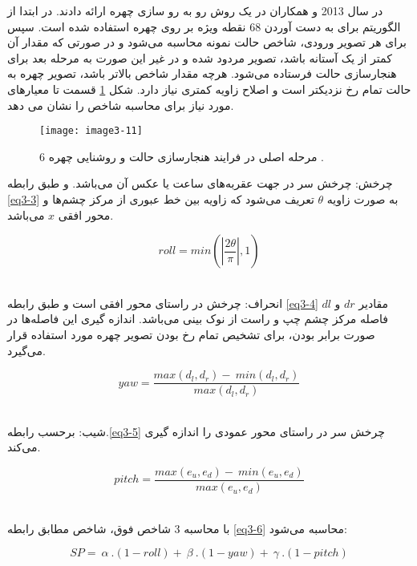 \noindent
در سال 2013  و همکاران در \cite{6196234} یک روش رو به رو سازی چهره ارائه دادند. در ابتدا از الگوریتم   برای به دست آوردن 68 نقطه ویژه بر روی چهره استفاده شده است. سپس برای هر تصویر ورودی، شاخص حالت نمونه   محاسبه می‌شود و در صورتی که مقدار آن کمتر از یک آستانه باشد، تصویر مردود شده و در غیر این صورت به مرحله بعد برای هنجارسازی حالت فرستاده می‌شود. هرچه مقدار شاخص  بالاتر باشد، تصویر چهره به حالت تمام رخ نزدیکتر است و اصلاح زاویه کمتری نیاز دارد. شکل \ref{image3-11} قسمت  تا  معیارهای مورد نیاز برای محاسبه شاخص  را نشان می دهد.

\begin{figure}[h]
\centering
  \texttt{[image: image3-11]}
  \caption{6 مرحله اصلی در فرایند هنجارسازی حالت و روشنایی چهره \cite{6196234}.}
  \label{image3-11}
\end{figure}

\noindent
چرخش: چرخش سر در جهت عقربه‌های ساعت یا عکس آن می‌باشد. و طبق رابطه \ref{eq3-3} به صورت زاویه $\theta$ تعریف می‌شود که زاویه بین خط عبوری از مرکز چشم‌ها و محور افقی $x$ می‌باشد.

\begin{equation}
\label{eq3-3}
roll=min(\left|\frac{2\theta}{\pi}\right|,1)
\end{equation}‏

\noindent	
انحراف: چرخش در راستای محور افقی است و طبق رابطه \ref{eq3-4} مقادیر $𝑑r$ و $𝑑l$ فاصله مرکز چشم چپ و راست از نوک بینی می‌باشد. اندازه گیری این فاصله‌ها در صورت برابر بودن، برای تشخیص تمام رخ بودن تصویر چهره مورد استفاده قرار می‌گیرد.

\begin{equation}
\label{eq3-4}
yaw=\frac{max\left(d_l,d_r\right)-\ min(d_l,d_r)}{max(d_l,d_r)}
\end{equation}‏

\noindent
شیب: برحسب رابطه.\ref{eq3-5} چرخش سر در راستای محور عمودی را اندازه گیری می‌کند.

\begin{equation}
\label{eq3-5}
pitch=\frac{max\left(e_u,e_d\right)-\ min(e_u,e_d)}{max(e_u,e_d)}	
\end{equation}‏

\noindent
با محاسبه 3 شاخص فوق، شاخص  مطابق رابطه \ref{eq3-6} محاسبه می‌شود:

\begin{equation}
\label{eq3-6}
SP=\ \alpha\ .(1-roll)+\ \beta\ .(1-yaw)+\ \gamma\ .(1-pitch)	
\end{equation}

